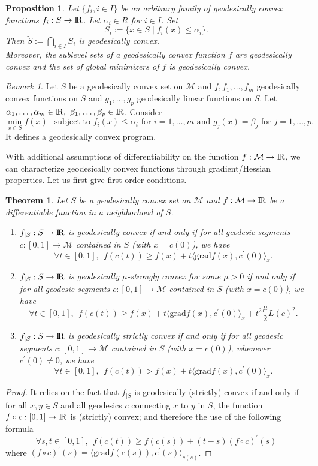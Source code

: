 \documentclass[10pt,a4paper]{book}
\theoremstyle{definition}
\theoremstyle{plain}
\newtheorem{thm}{Theorem}[section]
\newtheorem{prop}{Proposition}[section]
\theoremstyle{remark}
\newtheorem{rmk}{Remark}[section]
\newcommand{\grad}{\textrm{grad}}
\newcommand \M {\mathcal{M}}
\def\R{{\rm I\kern-0.16em R}}
\begin{document}
\begin{prop}
Let $\{f_i, i \in I\}$ be an arbitrary family of geodesically convex functions $f_i:S\to \R$. Let $\alpha_i\in R$ for $i\in I$. Set
$$S_i:=\{x\in S\mid f_i(x)\leq \alpha_i\}.$$
Then $\tilde{S}:=\bigcap_{i\in I}S_i$ is geodesically convex. \\Moreover, the sublevel sets of a geodesically convex function $f$ are geodesically convex and the set of global minimizers of $f$ is geodesically convex.
\end{prop}
\begin{rmk}
Let $S$ be a geodesically convex set on $\M$ and $f, f_1,\dots, f_m$ geodesically convex functions on $S$ and $g_1,\dots, g_p$ geodesically linear functions on $S$. Let $\alpha_1,\dots, \alpha_m \in \R,~\beta_1,\dots, \beta_p\in \R$. Consider 
$$\min_{x\in S}f(x)~~\text{ subject to }f_i(x)\leq \alpha_i \text{ for }i=1,\dots, m \text{ and }g_j(x)=\beta_j \text{ for }j=1,\dots, p.$$
It defines a geodesically convex program. 
\end{rmk}
With additional assumptions of differentiability on the function $f:\M \to \R$, we can characterize geodesically convex functions through gradient/Hessian properties. Let us first give first-order conditions.
\begin{thm}\label{thm.gconv.first}
Let $S$ be a geodesically convex set on $\M$ and $f:\M \to \R$ be a differentiable function in a neighborhood of $S$. \begin{enumerate}
\item $f_{\mid S}:S \to \R$ is geodesically convex if and only if for all geodesic segments $c:[0,1]\to \M$ contained in $S$ (with $x=c(0)$), we have
$$\forall t \in [0,1],~~f(c(t))\ge f(x)+t\langle \grad f(x),c^{\prime}(0)\rangle_x.$$
\item $f_{\mid S}:S \to \R$ is geodesically $\mu$-strongly convex for some $\mu>0$ if and only if for all geodesic segments $c:[0,1]\to \M$ contained in $S$ (with $x=c(0)$), we have
$$\forall t \in [0,1],~~f(c(t))\ge f(x)+t\langle \grad f(x),c^{\prime}(0)\rangle_x+t^2\frac{\mu}{2}L(c)^2.$$
\item $f_{\mid S}:S \to \R$ is geodesically strictly convex if and only if for all geodesic segments $c:[0,1]\to \M$ contained in $S$ (with $x=c(0)$), whenever $c^{\prime}(0)\neq 0$, we have
$$\forall t \in [0,1],~~f(c(t))> f(x)+t\langle \grad f(x),c^{\prime}(0)\rangle_x.$$
\end{enumerate}
\end{thm}
\begin{proof}
It relies on the fact that $f_{\mid S}$ is geodesically (strictly) convex if and only if for all $x,y \in S$ and all geodesics $c$ connecting $x$ to $y$ in $S$, the function $f\circ c:[0,1]\to \R$ is (strictly) convex; and therefore the use of the following formula
$$\forall s,t \in [0,1],~~f(c(t))\ge f(c(s))+(t-s)(f\circ c)^{\prime}(s)$$
where $(f\circ c)^{\prime}(s)=\langle \grad f(c(s)),c^{\prime}(s)\rangle_{c(s)}$.
\end{proof}
\end{document}
